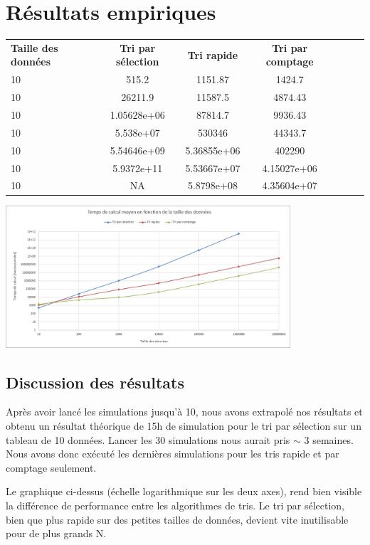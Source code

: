 \documentclass[11pt]{article}
\begin{document}
\section*{Résultats empiriques}

\begin{tabular}{|l c c c|c c c|}
\hline
\textbf{Taille des données} & \textbf{Tri par sélection} & \textbf{Tri rapide}&  \textbf{Tri par comptage} \\
10\up{1}& 515.2 & 1151.87 & 1424.7  \\
10\up{2}& 26211.9 & 11587.5 & 4874.43  \\
10\up{3}& 1.05628e+06  & 87814.7 & 9936.43  \\
10\up{4}& 5.538e+07 & 530346 & 44343.7  \\
10\up{5}& 5.54646e+09 & 5.36855e+06 & 402290  \\
10\up{6}& 5.9372e+11 & 5.53667e+07 & 4.15027e+06  \\
10\up{7}& NA & 5.8798e+08 & 4.35604e+07  \\
\hline
\end{tabular}

\medskip

\noindent\includegraphics[width=400px]{tests/graphique}

\subsection*{Discussion des résultats}
Après avoir lancé les simulations jusqu'à 10, nous avons extrapolé nos résultats et obtenu un résultat théorique de 15h de simulation pour le tri par sélection sur un tableau de 10 données. Lancer les 30 simulations nous aurait pris $\sim $ 3 semaines. Nous avons donc exécuté les dernières simulations pour les tris rapide et par comptage seulement.

Le graphique ci-dessus (échelle logarithmique sur les deux axes), rend bien visible la différence de performance entre les algorithmes de tris. Le tri par sélection, bien que plus rapide sur des petites tailles de données, devient vite inutilisable pour de plus grands N.
\end{document}
